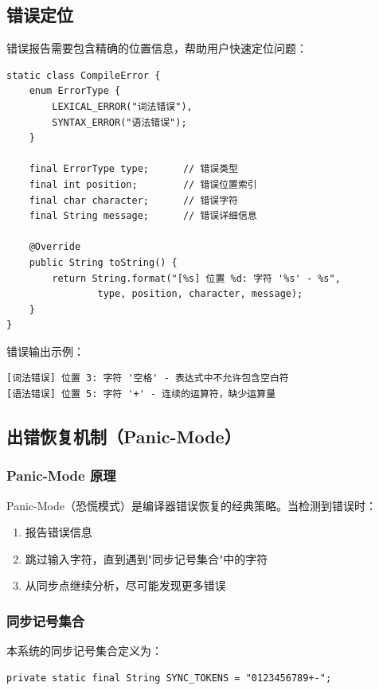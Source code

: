 \documentclass[a4paper]{article}
\begin{document}
\subsection{错误定位}

错误报告需要包含精确的位置信息，帮助用户快速定位问题：

\begin{lstlisting}[caption={错误定位实现}]
static class CompileError {
    enum ErrorType {
        LEXICAL_ERROR("词法错误"),
        SYNTAX_ERROR("语法错误");
    }
    
    final ErrorType type;      // 错误类型
    final int position;        // 错误位置索引
    final char character;      // 错误字符
    final String message;      // 错误详细信息
    
    @Override
    public String toString() {
        return String.format("[%s] 位置 %d: 字符 '%s' - %s",
                type, position, character, message);
    }
}
\end{lstlisting}

错误输出示例：
\begin{lstlisting}[caption={错误输出示例},language={}]
[词法错误] 位置 3: 字符 '空格' - 表达式中不允许包含空白符
[语法错误] 位置 5: 字符 '+' - 连续的运算符，缺少运算量
\end{lstlisting}

\subsection{出错恢复机制（Panic-Mode）}

\subsubsection{Panic-Mode 原理}

Panic-Mode（恐慌模式）是编译器错误恢复的经典策略。当检测到错误时：
\begin{enumerate}
    \item 报告错误信息
    \item 跳过输入字符，直到遇到"同步记号集合"中的字符
    \item 从同步点继续分析，尽可能发现更多错误
\end{enumerate}

\subsubsection{同步记号集合}

本系统的同步记号集合定义为：
\begin{lstlisting}[caption={同步记号集合定义}]
private static final String SYNC_TOKENS = "0123456789+-";
\end{lstlisting}
\end{document}
